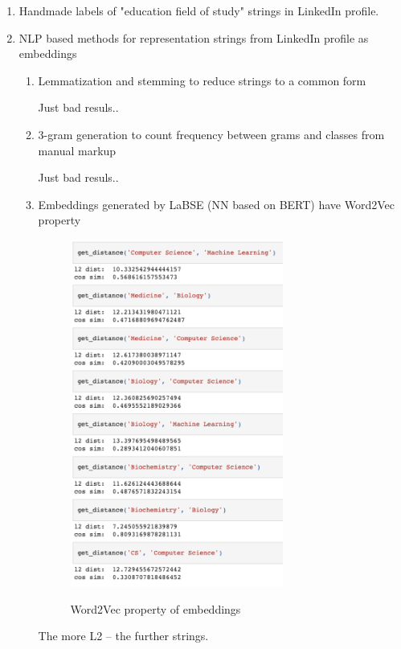 \documentclass[12pt]{article}
\theoremstyle{plain}
\theoremstyle{definition}
\begin{document}
\begin{enumerate}
    \item Handmade labels of "education field of study" strings in LinkedIn profile.
    
    \item NLP based methods for representation strings from LinkedIn profile as embeddings
    
    \begin{enumerate}
        \item Lemmatization and stemming to reduce strings to a common form
        
        Just bad resuls..
        
        \item 3-gram generation to count frequency between grams and classes from manual markup
        
        Just bad resuls..
        
        \item Embeddings generated by LaBSE (NN based on BERT) have Word2Vec property
        
        \begin{figure}[H]
          \centering
          \includegraphics[width=70mm]{figures/collection/Word2Vec-LaBSE.png}
          \label{fig:gd}
          \caption{Word2Vec property of embeddings}
        \end{figure}
        
        The more L2 -- the further strings.
        

\end{enumerate}
\end{enumerate}
\end{document}

